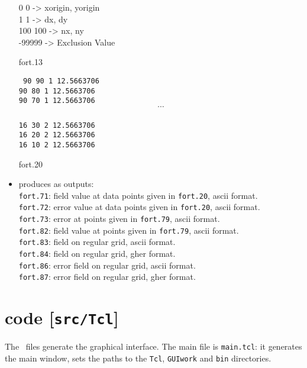 \begin{itemize}
\begin{exfile}[H]
0  0  -> xorigin, yorigin\\
1  1  -> dx, dy\\
100  100  -> nx, ny\\
-99999  -> Exclusion Value
\caption{fort.13}
\end{exfile}

\begin{exfile}[H]
\tt
90 90 1 12.5663706\\
90 80 1 12.5663706\\
90 70 1 12.5663706\\
$$\cdots$$\\
16 30 2 12.5663706\\
16 20 2 12.5663706\\
16 10 2 12.5663706
\caption{fort.20}
\end{exfile}
	  
  
	  
	  
\item produces as outputs:	\\							
\texttt{fort.71}:			field value at data points given in \texttt{fort.20}, ascii format.\\					
\texttt{fort.72}:			error value at data points given in \texttt{fort.20}, ascii format.\\					
\texttt{fort.73}:			error at points given in \texttt{fort.79}, ascii format.\\					
\texttt{fort.82}:			field value at points given in \texttt{fort.79}, ascii format.\\					
\texttt{fort.83}:			field on regular grid, ascii format.\\					
\texttt{fort.84}:			field on regular grid, gher format.\\					
\texttt{fort.86}:			error field on regular grid, ascii format.\\					
\texttt{fort.87}:			error field on regular grid, gher format.	
 				
\end{itemize}


\section[\tcltk\divaspace code]{\tcltk\divaspace code [\texttt{src/Tcl}]\label{tclcode}}

The \tcltk\, files generate the graphical interface. The main file is \texttt{main.tcl}: it generates the main window, sets the paths to the \texttt{Tcl}, \texttt{GUIwork} and \texttt{bin} directories.

